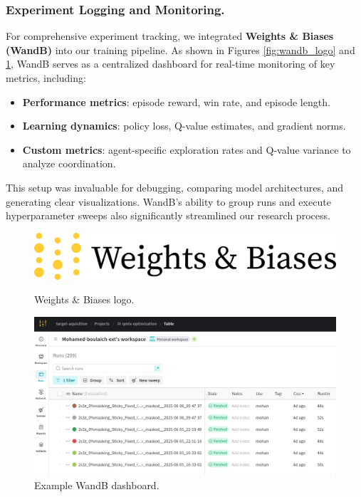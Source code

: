 \documentclass[../Main.tex]{subfiles}
\begin{document}
\subsubsection{Experiment Logging and Monitoring.}
For comprehensive experiment tracking, we integrated \textbf{Weights \& Biases (WandB)} into our training pipeline. As shown in Figures \ref{fig:wandb_logo} and \ref{fig:wandb_dashboard}, WandB serves as a centralized dashboard for real-time monitoring of key metrics, including:
\begin{itemize}
    \item \textbf{Performance metrics}: episode reward, win rate, and episode length.
    \item \textbf{Learning dynamics}: policy loss, Q-value estimates, and gradient norms.
    \item \textbf{Custom metrics}: agent-specific exploration rates and Q-value variance to analyze coordination.
\end{itemize}
This setup was invaluable for debugging, comparing model architectures, and generating clear visualizations. WandB's ability to group runs and execute hyperparameter sweeps also significantly streamlined our research process.

\begin{figure}[H]
    \centering
    \begin{minipage}{0.35\textwidth}
        \centering
        \includegraphics[width=0.8\linewidth]{img/logo/wandb.png}
        \caption{Weights \& Biases logo.}
        \label{fig:wandb_logo}
    \end{minipage}\hfill
    \begin{minipage}{0.6\textwidth}
        \centering
        \includegraphics[width=\linewidth]{img/wandb-demo.png}
        \caption{Example WandB dashboard.}
        \label{fig:wandb_dashboard}
    \end{minipage}
\end{figure}
\end{document}
